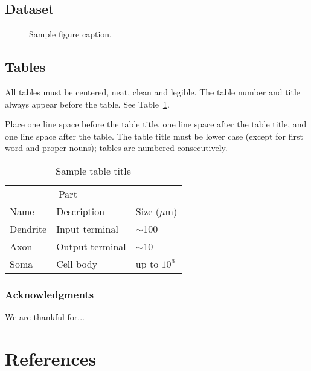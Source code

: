 \documentclass{article}
\begin{document}
\subsection{Dataset}

\begin{figure}[h]
  \centering
  \fbox{\rule[-.5cm]{0cm}{4cm} \rule[-.5cm]{4cm}{0cm}}
  \caption{Sample figure caption.}
\end{figure}

\subsection{Tables}

All tables must be centered, neat, clean and legible.  The table
number and title always appear before the table.  See
Table~\ref{sample-table}.

Place one line space before the table title, one line space after the
table title, and one line space after the table. The table title must
be lower case (except for first word and proper nouns); tables are
numbered consecutively.

\begin{table}[t]
  \caption{Sample table title}
  \label{sample-table}
  \centering
  \begin{tabular}{lll}
    \toprule
    \multicolumn{2}{c}{Part}                   \\
    \cmidrule{1-2}
    Name     & Description     & Size ($\mu$m) \\
    \midrule
    Dendrite & Input terminal  & $\sim$100     \\
    Axon     & Output terminal & $\sim$10      \\
    Soma     & Cell body       & up to $10^6$  \\
    \bottomrule
  \end{tabular}
\end{table}

\subsubsection*{Acknowledgments}

We are thankful for...

\section*{References}
\small




%
%
\end{document}
